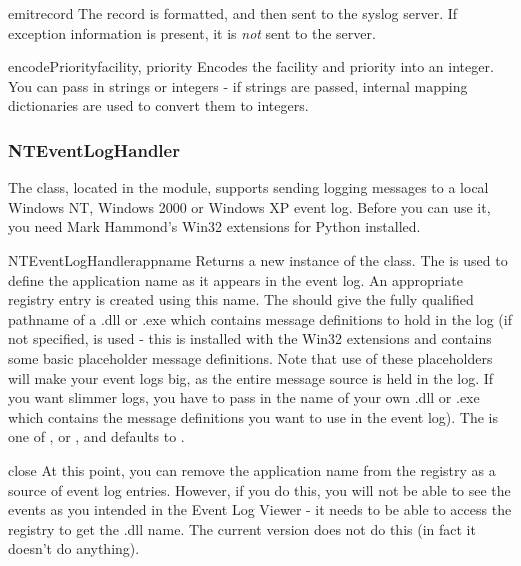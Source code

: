 \begin{methoddesc}{emit}{record}
The record is formatted, and then sent to the syslog server. If
exception information is present, it is \emph{not} sent to the server.
\end{methoddesc}

\begin{methoddesc}{encodePriority}{facility, priority}
Encodes the facility and priority into an integer. You can pass in strings
or integers - if strings are passed, internal mapping dictionaries are used
to convert them to integers.
\end{methoddesc}

\subsubsection{NTEventLogHandler}

The  class, located in the
 module, supports sending logging messages to
a local Windows NT, Windows 2000 or Windows XP event log. Before you
can use it, you need Mark Hammond's Win32 extensions for Python
installed.

\begin{classdesc}{NTEventLogHandler}{appname}
Returns a new instance of the  class. The
 is used to define the application name as it appears in the
event log. An appropriate registry entry is created using this name.
The  should give the fully qualified pathname of a .dll or .exe
which contains message definitions to hold in the log (if not specified,
 is used - this is installed with the Win32
extensions and contains some basic placeholder message definitions.
Note that use of these placeholders will make your event logs big, as the
entire message source is held in the log. If you want slimmer logs, you have
to pass in the name of your own .dll or .exe which contains the message
definitions you want to use in the event log). The  is one of
,  or , and
defaults to .
\end{classdesc}

\begin{methoddesc}{close}{}
At this point, you can remove the application name from the registry as a
source of event log entries. However, if you do this, you will not be able
to see the events as you intended in the Event Log Viewer - it needs to be
able to access the registry to get the .dll name. The current version does
not do this (in fact it doesn't do anything).
\end{methoddesc}

